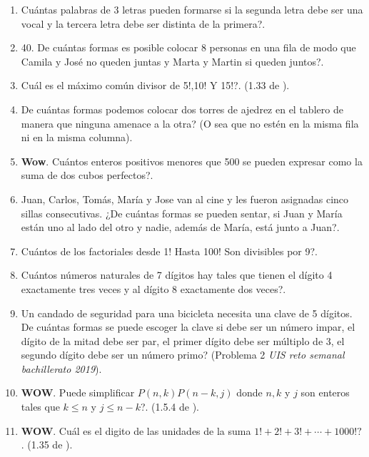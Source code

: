 \begin{enumerate}
	\item Cuántas palabras de 3 letras pueden formarse si la segunda letra debe ser una vocal y la tercera letra debe ser distinta de la primera?.
	
	\item 40.	De cuántas formas es posible colocar 8 personas en una fila de modo que Camila y José no queden juntas y Marta y Martin si queden juntos?.
	
	\item 	Cuál es el máximo común divisor de 5!,10! Y 15!?. (1.33 de \cite{ICP_Aops}).
	
	\item De cuántas formas podemos colocar dos torres de ajedrez en el tablero de manera que ninguna amenace a la otra? (O sea que no estén en la misma fila ni en la misma columna).
	
	\item \textbf{Wow}. Cuántos enteros positivos menores que 500 se pueden expresar como la suma de dos cubos perfectos?.
	
	\item Juan, Carlos, Tomás, María y Jose van al cine y les fueron asignadas cinco sillas consecutivas. ¿De cuántas formas se pueden sentar, si Juan y María están uno al lado del otro y nadie, además de María, está junto a Juan?.
	
	\item Cuántos de los factoriales desde 1! Hasta 100! Son divisibles por 9?.
	
	\item Cuántos números naturales de 7 dígitos hay tales que tienen el dígito 4 exactamente tres veces y al dígito 8 exactamente dos veces?.
	
	\item Un candado de seguridad para una bicicleta necesita una clave de 5 dígitos. De cuántas formas se puede escoger la clave si debe ser un número impar, el dígito de la mitad debe ser par, el primer dígito debe ser múltiplo de 3, el segundo dígito debe ser un número primo? (Problema 2 \textit{UIS reto semanal bachillerato 2019}).
	
	\item \textbf{WOW}. Puede simplificar $P(n,k)P({n-k},j)$ donde $n,k$ y $j$ son enteros tales que $k\leq n$ y $j\leq {n-k}$?. (1.5.4 de \cite{ICP_Aops}).
	
	\item \textbf{WOW}. Cuál es el digito de las unidades de la suma $1!+2!+3!+\cdots+1000!?$. (1.35 de \cite{ICP_Aops}).
	

\end{enumerate}
